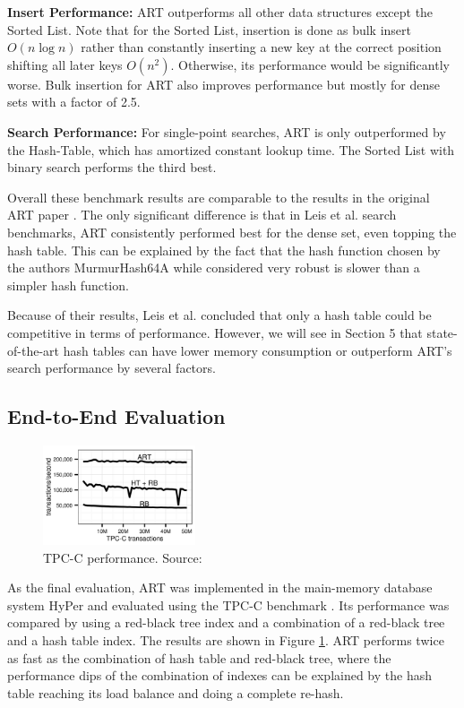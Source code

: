 \documentclass[acmtog, nonacm]{acmart}
\begin{document}
\textbf{Insert Performance:} ART outperforms all other data structures except the Sorted List. 
Note that for the Sorted List, insertion is done as bulk insert $O(n\log n)$ rather than constantly 
inserting a new key at the correct position shifting all later keys $O(n^2)$. Otherwise, its performance would be significantly
worse. Bulk insertion for ART also improves performance but mostly for dense sets \cite{6544812} with a factor of 2.5.

\textbf{Search Performance:} For single-point searches, ART is only outperformed by the Hash-Table, which has amortized
constant lookup time. The Sorted List with binary search performs the third best.

Overall these benchmark results are comparable to the results in the original ART paper \cite{6544812}. 
The only significant difference is that in Leis et al. search benchmarks, ART consistently performed best for the 
dense set, even topping the hash table. This can be explained by the fact that the hash function chosen by the authors 
MurmurHash64A \cite{murmur} while considered very robust is slower than a simpler hash function.

Because of their results, Leis et al. concluded that only a hash table could be competitive in terms
of performance. However, we will see in Section 5 that state-of-the-art hash tables can have lower memory consumption
or outperform ART's search performance by several factors.

\subsection{End-to-End Evaluation}

\begin{figure}
    \centering
    \includegraphics[width=0.4\textwidth]{images/07-art-tpc-c.png}
    \caption{TPC-C performance.
    Source: \cite{6544812}}
    \label{fig:art-tpc-c}
\end{figure}

As the final evaluation, ART was implemented in the main-memory database system HyPer \cite{5767867} and evaluated 
using the TPC-C benchmark \cite{6544812}. Its performance was compared by using a red-black tree index and a 
combination of a red-black tree and a hash table index. The results are shown in Figure \ref{fig:art-tpc-c}. ART 
performs twice as fast as the combination of hash table and red-black tree, where the performance dips of the combination of indexes can be 
explained by the hash table reaching its load balance and doing a complete re-hash.
\end{document}
